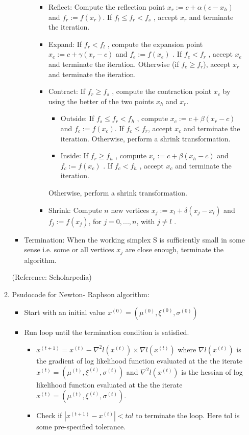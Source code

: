 \documentclass[12pt]{article}
\begin{document}
\begin{enumerate}[label=(\alph*)]
\begin{enumerate}[label=(\roman*)]
\begin{itemize}
\begin{itemize}
\begin{itemize}
\item Reflect: Compute the reflection point $x_r:=c+\alpha(c-x_h)$ and $f_r:=f(x_r)$. If $f_l\leq f_r<f_s$ , accept $x_r$ and terminate the iteration.
\item Expand: If $f_r<f_l$ , compute the expansion point $x_e:=c+\gamma(x_r−c)$ and $f_e:=f(x_e)$ . If $f_e<f_r$ , accept $x_e$ and terminate the iteration. Otherwise (if $f_e \geq f_r$), accept $x_r$ and terminate the iteration.
\item Contract: If $f_r\geq f_s$ , compute the contraction point $x_c$ by using the better of the two points $x_h$ and $x_r$.
\begin{itemize}
\item Outside: If $f_s\leq f_r<f_h$ , compute $x_c:=c+\beta(x_r-c)$ and $f_c:=f(x_c)$. If $f_c\leq f_r$, accept $x_c$ and terminate the iteration.
Otherwise, perform a shrink transformation.
\item Inside: If $f_r\geq f_h$ , compute $x_c:=c+\beta(x_h-c)$ and $f_c:=f(x_c)$ . If $f_c<f_h$ , accept $x_c$ and terminate the iteration.
\end{itemize}
Otherwise, perform a shrink transformation.
\item Shrink: Compute $n$ new vertices $x_j:=x_l+\delta(x_j-x_l)$ and $f_j:=f(x_j)$, for $j=0,...,n$, with $j\neq l$ .
\end{itemize}
\end{itemize}
\item Termination: When the working simplex S is sufficiently small in some sense i.e. some or all vertices $x_j$ are close enough, terminate the algorithm.
\end{itemize}
(Reference: Scholarpedia)
\item Psudocode for Newton- Raphson algorithm:
\begin{itemize}
\item Start with an initial value $x^{(0)}=(\mu^{(0)},\xi^{(0)},\sigma^{(0)})$
\item Run loop until the termination condition is satisfied.
\begin{itemize}
\item $x^{(t+1)}=x^{(t)}-\nabla^2 l(x^{(t)}) \times \nabla l(x^{(t)})$ where $\nabla l(x^{(t)})$ is the gradient of log likelihood function evaluated at the the iterate $x^{(t)}=(\mu^{(t)},\xi^{(t)},\sigma^{(t)})$ and $\nabla^2 l(x^{(t)})$ is the hessian of log likelihood function evaluated at the the iterate $x^{(t)}=(\mu^{(t)},\xi^{(t)},\sigma^{(t)})$.
\item Check if $|x^{(t+1)}-x^{(t)}|<tol$ to terminate the loop. Here tol is some pre-specified tolerance.
\end{itemize}
\end{itemize}
 


\end{enumerate}
\end{enumerate}
\end{document}

